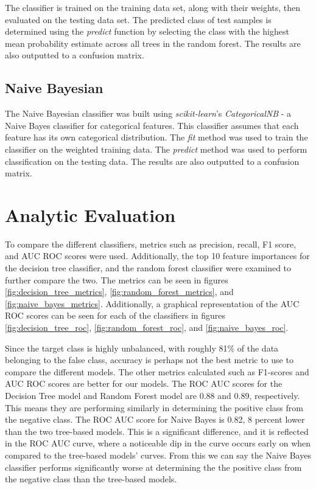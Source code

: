 \documentclass[10pt, conference, compsocconf]{IEEEtran}
\begin{document}
The classifier is trained on the training data set, along with their weights, then evaluated on the testing data set. The predicted class of test samples is determined using the \textit{predict} function by selecting the class with the highest mean probability estimate across all trees in the random forest. The results are also outputted to a confusion matrix.

\subsection{Naive Bayesian}

The Naive Bayesian classifier was built using \textit{scikit-learn}'s \textit{CategoricalNB} - a Naive Bayes classifier for categorical features. This classifier assumes that each feature has its own categorical distribution. The \textit{fit} method was used to train the classifier on the weighted training data. The \textit{predict} method was used to perform classification on the testing data. The results are also outputted to a confusion matrix.

\section{Analytic Evaluation}

To compare the different classifiers, metrics such as precision, recall, F1 score, and AUC ROC scores were used. Additionally, the top 10 feature importances for the decision tree classifier, and the random forest classifier were examined to further compare the two. The metrics can be seen in figures \ref{fig:decision_tree_metrics}, \ref{fig:random_forest_metrics}, and \ref{fig:naive_bayes_metrics}. Additionally, a graphical representation of the AUC ROC scores can be seen for each of the classifiers in figures \ref{fig:decision_tree_roc}, \ref{fig:random_forest_roc}, and \ref{fig:naive_bayes_roc}.

Since the target class is highly unbalanced, with roughly 81\% of the data belonging to the false class, accuracy is perhaps not the best metric to use to compare the different models. The other metrics calculated such as F1-scores and AUC ROC scores are better for our models. The ROC AUC scores for the Decision Tree model and Random Forest model are 0.88 and 0.89, respectively. This means they are performing similarly in determining the positive class from the negative class. The ROC AUC score for Naive Bayes is 0.82, 8 percent lower than the two tree-based models. This is a significant difference, and it is reflected in the ROC AUC curve, where a noticeable dip in the curve occurs early on when compared to the tree-based models' curves. From this we can say the Naive Bayes classifier performs significantly worse at determining the the positive class from the negative class than the tree-based models.
\end{document}
